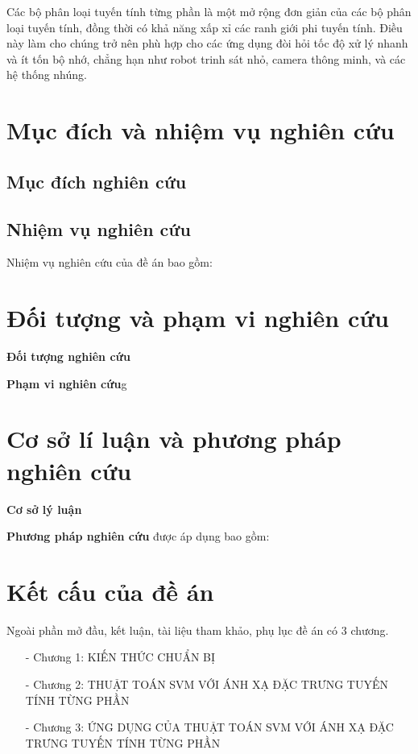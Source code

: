 Các bộ phân loại tuyến tính từng phần là một mở rộng đơn giản của các bộ phân loại tuyến tính, đồng thời có khả năng xấp xỉ các ranh giới phi tuyến tính. Điều này làm cho chúng trở nên phù hợp cho các ứng dụng đòi hỏi tốc độ xử lý nhanh và ít tốn bộ nhớ, chẳng hạn như robot trinh sát nhỏ, camera thông minh, và các hệ thống nhúng.

\section*{Mục đích và nhiệm vụ nghiên cứu}
\subsection*{Mục đích nghiên cứu}

\subsection*{Nhiệm vụ nghiên cứu}
Nhiệm vụ nghiên cứu của đề án bao gồm:

\section*{Đối tượng và phạm vi nghiên cứu}
\textbf{Đối tượng nghiên cứu}

\textbf{Phạm vi nghiên cứu}g

\section*{Cơ sở lí luận và phương pháp nghiên cứu}
\textbf{Cơ sở lý luận}

\textbf{Phương pháp nghiên cứu} được áp dụng bao gồm:

\section*{Kết cấu của đề án}
Ngoài phần mở đầu, kết luận, tài liệu tham khảo, phụ lục đề án có 3 chương.
\begin{itemize}
    \item[-] Chương 1: KIẾN THỨC CHUẨN BỊ
    \item[-] Chương 2: THUẬT TOÁN SVM VỚI ÁNH XẠ ĐẶC TRƯNG TUYẾN TÍNH TỪNG PHẦN
    \item[-] Chương 3: ỨNG DỤNG CỦA THUẬT TOÁN SVM VỚI ÁNH XẠ ĐẶC TRƯNG TUYẾN TÍNH TỪNG PHẦN
\end{itemize}